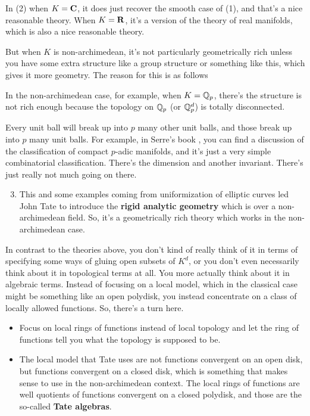 In (2) when $K = \mathbf C$, it does just recover the smooth case of (1), and that's a nice reasonable theory. When $K = \mathbf R$, it's a version of the theory of real manifolds, which is also a nice reasonable theory. 

But when $K$ is non-archimedean, it's not particularly geometrically rich unless you have some extra structure like a group structure or something like this, which gives it more geometry. The reason for this is as follows 



In the non-archimedean case, for example, when $K=\Bbb{Q}_p$, there's the structure is not rich enough because the topology on $\Bbb{Q}_p$ (or $\Bbb{Q}_p^{d}$) is totally disconnected.

\begin{remark}
    Every unit ball will break up into $p$ many other unit balls, and those break up into $p$ many unit balls. For example, in Serre's book \citeme{}, you can find a discussion of the classification of compact $p$-adic manifolds, and it's just a very simple combinatorial classification. There's the dimension and another invariant. There's just really not much going on there.
\end{remark}
    
\begin{enumerate}
    \setcounter{enumi}{2} 
    
    \item  This and some examples coming from uniformization of elliptic curves led John Tate \citeme{} to introduce the \textbf{rigid analytic geometry} which is over a non-archimedean field. So, it's a geometrically rich theory which works in the non-archimedean case. 
\end{enumerate}



In contrast to the theories above, you don't kind of really think of it in terms of specifying some ways of gluing open subsets of $K^{d}$, or you don't even necessarily think about it in topological terms at all. You more actually think about it in algebraic terms. Instead of focusing on a local model, which in the classical case might be something like an open polydisk, you instead concentrate on a class of locally allowed functions. So, there's a turn here. 

\begin{itemize}
    \item Focus on local rings of functions instead of local topology and let the ring of functions tell you what the topology is supposed to be.

    \item The local model that Tate uses are not functions convergent on an open disk, but functions convergent on a closed disk, which is something that makes sense to use in the non-archimedean context. The local rings of functions are well quotients of functions convergent on a closed polydisk, and those are the so-called \textbf{Tate algebras}.
\end{itemize}

